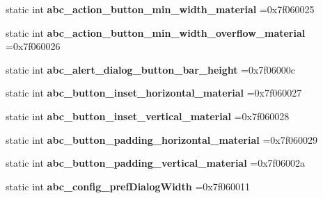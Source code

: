 \begin{DoxyCompactItemize}
static int {\bfseries abc\+\_\+action\+\_\+button\+\_\+min\+\_\+width\+\_\+material} =0x7f060025
\item 
\mbox{\label{classandroid_1_1support_1_1design_1_1R_1_1dimen_af148db91531fbe577c214f86238cca70}} 
static int {\bfseries abc\+\_\+action\+\_\+button\+\_\+min\+\_\+width\+\_\+overflow\+\_\+material} =0x7f060026
\item 
\mbox{\label{classandroid_1_1support_1_1design_1_1R_1_1dimen_ac1eaf363d3541e7877f28dd4adc20e15}} 
static int {\bfseries abc\+\_\+alert\+\_\+dialog\+\_\+button\+\_\+bar\+\_\+height} =0x7f06000c
\item 
\mbox{\label{classandroid_1_1support_1_1design_1_1R_1_1dimen_a1b44e6add31614306a2ca4c03dfad93b}} 
static int {\bfseries abc\+\_\+button\+\_\+inset\+\_\+horizontal\+\_\+material} =0x7f060027
\item 
\mbox{\label{classandroid_1_1support_1_1design_1_1R_1_1dimen_aa26ce620174d4bbe4046e95b1618d99b}} 
static int {\bfseries abc\+\_\+button\+\_\+inset\+\_\+vertical\+\_\+material} =0x7f060028
\item 
\mbox{\label{classandroid_1_1support_1_1design_1_1R_1_1dimen_ab316d4ebf9f4068413d73ef44fcc00db}} 
static int {\bfseries abc\+\_\+button\+\_\+padding\+\_\+horizontal\+\_\+material} =0x7f060029
\item 
\mbox{\label{classandroid_1_1support_1_1design_1_1R_1_1dimen_a05683c29c95d22f304d522f5ccda42d7}} 
static int {\bfseries abc\+\_\+button\+\_\+padding\+\_\+vertical\+\_\+material} =0x7f06002a
\item 
\mbox{\label{classandroid_1_1support_1_1design_1_1R_1_1dimen_a369eb422723516d2174da971678d4fd8}} 
static int {\bfseries abc\+\_\+config\+\_\+pref\+Dialog\+Width} =0x7f060011
\item 
\mbox{\label{classandroid_1_1support_1_1design_1_1R_1_1dimen_a7f3821b650b6b17f6155ee87132eebb1}} 

\end{DoxyCompactItemize}
